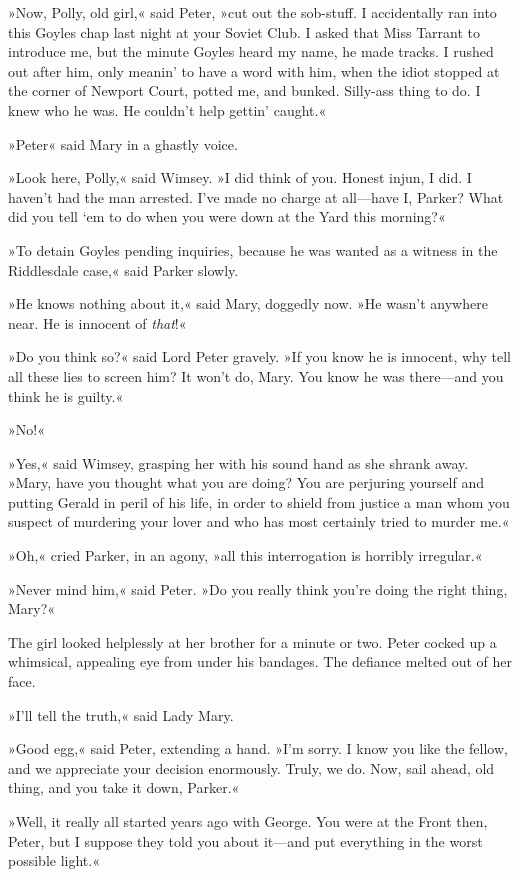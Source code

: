 »Now, Polly, old girl,« said Peter, »cut out the sob-stuff. I accidentally ran into this Goyles chap last night at your Soviet Club.  I asked that Miss Tarrant to introduce me, but the minute Goyles heard my name, he made tracks. I rushed out after him, only meanin' to have a word with him, when the idiot stopped at the corner of Newport Court, potted me, and bunked. Silly-ass thing to do. I knew who he was. He couldn't help gettin' caught.«

»Peter\longdash« said Mary in a ghastly voice.

»Look here, Polly,« said Wimsey. »I did think of you. Honest injun, I did. I haven't had the man arrested. I've made no charge at all—have I, Parker? What did you tell `em to do when you were down at the Yard this morning?«

»To detain Goyles pending inquiries, because he was wanted as a witness in the Riddlesdale case,« said Parker slowly.

»He knows nothing about it,« said Mary, doggedly now. »He wasn't anywhere near. He is innocent of \textit{that}!«

»Do you think so?« said Lord Peter gravely. »If you know he is innocent, why tell all these lies to screen him? It won't do, Mary. You know he was there—and you think he is guilty.«

»No!«

»Yes,« said Wimsey, grasping her with his sound hand as she shrank away. »Mary, have you thought what you are doing? You are perjuring yourself and putting Gerald in peril of his life, in order to shield from justice a man whom you suspect of murdering your lover and who has most certainly tried to murder me.«

»Oh,« cried Parker, in an agony, »all this interrogation is horribly irregular.«

»Never mind him,« said Peter. »Do you really think you're doing the right thing, Mary?«

The girl looked helplessly at her brother for a minute or two. Peter cocked up a whimsical, appealing eye from under his bandages. The defiance melted out of her face.

»I'll tell the truth,« said Lady Mary.

»Good egg,« said Peter, extending a hand. »I'm sorry. I know you like the fellow, and we appreciate your decision enormously. Truly, we do.  Now, sail ahead, old thing, and you take it down, Parker.«

»Well, it really all started years ago with George. You were at the Front then, Peter, but I suppose they told you about it—and put everything in the worst possible light.«


